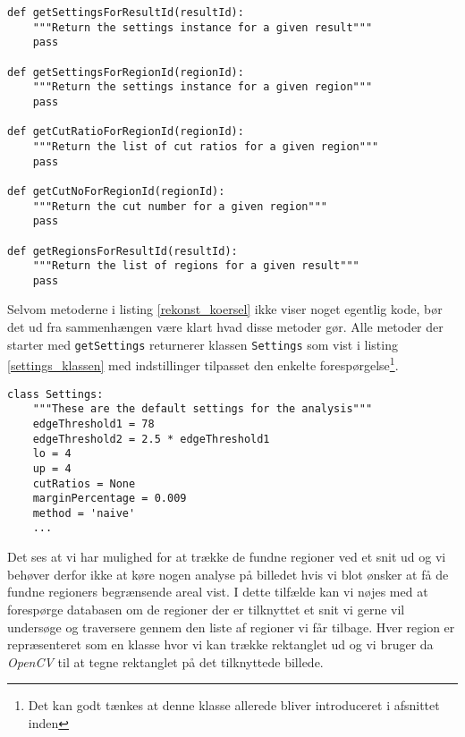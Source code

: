{\begin{lstlisting}[caption={Metoder til rekonstruktion af kørsler},captionpos=b,label={rekonst_koersel},numbers=none]
def getSettingsForResultId(resultId):
    """Return the settings instance for a given result"""
    pass

def getSettingsForRegionId(regionId):
    """Return the settings instance for a given region"""
    pass

def getCutRatioForRegionId(regionId):
    """Return the list of cut ratios for a given region"""
    pass

def getCutNoForRegionId(regionId):
    """Return the cut number for a given region"""
    pass

def getRegionsForResultId(resultId):
    """Return the list of regions for a given result"""
    pass
\end{lstlisting}

Selvom metoderne i listing \ref{rekonst_koersel} ikke viser noget
egentlig kode, bør det ud fra sammenhængen være klart hvad disse metoder
gør. Alle metoder der starter med \texttt{getSettings} returnerer
klassen \texttt{Settings} som vist i listing \ref{settings_klassen} med
indstillinger tilpasset den enkelte forespørgelse\footnote{Det kan godt tænkes
at denne klasse allerede bliver introduceret i afsnittet inden}.

\vspace{0.5cm}
\begin{lstlisting}[caption={Settings-klassen med standardindstillinger},captionpos=b,label={settings_klassen},numbers=none]
class Settings:
    """These are the default settings for the analysis"""
    edgeThreshold1 = 78
    edgeThreshold2 = 2.5 * edgeThreshold1
    lo = 4
    up = 4
    cutRatios = None
    marginPercentage = 0.009
    method = 'naive'
    ...
\end{lstlisting}

Det ses at vi har mulighed for at trække de fundne regioner ved et
snit ud og vi behøver derfor ikke at køre nogen analyse på billedet hvis
vi blot ønsker at få de fundne regioners begrænsende areal vist. I dette
tilfælde kan vi nøjes med at forespørge databasen om de regioner der er
tilknyttet et snit vi gerne vil undersøge og traversere gennem den liste
af regioner vi får tilbage. Hver region er repræsenteret som en klasse
hvor vi kan trække rektanglet ud og vi bruger da \emph{OpenCV} til at
tegne rektanglet på det tilknyttede billede.
}

